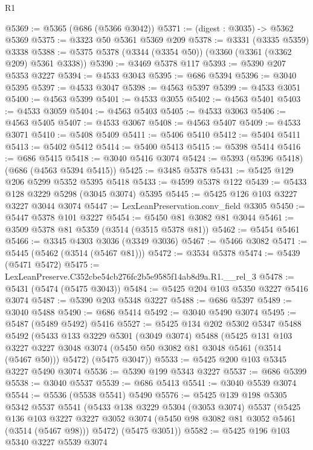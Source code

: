 \begin{lexlean}{R1}
\begin{coremodule}
@5369 := @5365 (@686 (@5366 @3042))
@5371 := (digest : @3035) -> @5362 @5369
@5375 := @3323 @50 @5361 @5369 @209
@5378 := @3331 (@3335 @5359) @3338
@5388 := @5375 @5378 (@3344 (@3354 @50)) (@3360 (@3361 (@3362 @209) @5361 @3338))
@5390 := @3469 @5378 @117
@5393 := @5390 @207 @5353 @3227
@5394 := @4533 @3043
@5395 := @686 @5394
@5396 := @3040 @5395
@5397 := @4533 @3047
@5398 := @4563 @5397
@5399 := @4533 @3051
@5400 := @4563 @5399
@5401 := @4533 @3055
@5402 := @4563 @5401
@5403 := @4533 @3059
@5404 := @4563 @5403
@5405 := @4533 @3063
@5406 := @4563 @5405
@5407 := @4533 @3067
@5408 := @4563 @5407
@5409 := @4533 @3071
@5410 := @5408 @5409
@5411 := @5406 @5410
@5412 := @5404 @5411
@5413 := @5402 @5412
@5414 := @5400 @5413
@5415 := @5398 @5414
@5416 := @686 @5415
@5418 := @3040 @5416 @3074
@5424 := @5393 (@5396 @5418) (@686 (@4563 @5394 @5415))
@5425 := @3485 @5378
@5431 := @5425 @129 @206 @5299 @5352 @5395 @5418
@5433 := @4599 @5378 @122
@5439 := @5433 @128 @3229 @5298 (@3045 @3074) @5395
@5445 := @5425 @126 @103 @3227 @3227 @3044 @3074
@5447 := LexLeanPreservation.conv_field @3305
@5450 := @5447 @5378 @101 @3227
@5454 := @5450 @81 @3082 @81 @3044
@5461 := @3509 @5378 @81 @5359 (@3514 (@3515 @5378 @81))
@5462 := @5454 @5461
@5466 := @3345 @4303 @3036 (@3349 @3036)
@5467 := @5466 @3082
@5471 := @5445 (@5462 (@3514 (@5467 @81)))
@5472 := @3534 @5378
@5474 := @5439 (@5471 @5472)
@5475 := LexLeanPreserve.C352cbe54cb276fc2b5e9585f14ab8d9a.R1.__rel_3
@5478 := @5431 (@5474 (@5475 @3043))
@5484 := @5425 @204 @103 @5350 @3227 @5416 @3074
@5487 := @5390 @203 @5348 @3227
@5488 := @686 @5397
@5489 := @3040 @5488
@5490 := @686 @5414
@5492 := @3040 @5490 @3074
@5495 := @5487 (@5489 @5492) @5416
@5527 := @5425
    @134
    @202
    @5302
    @5347
    @5488
    @5492
    (@5433
      @133
      @3229
      @5301
      (@3049 @3074)
      @5488
      (@5425
        @131
        @103
        @3227
        @3227
        @3048
        @3074
        (@5450 @50 @3082 @81 @3048 @5461 (@3514 (@5467 @50)))
        @5472)
      (@5475 @3047))
@5533 := @5425 @200 @103 @5345 @3227 @5490 @3074
@5536 := @5390 @199 @5343 @3227
@5537 := @686 @5399
@5538 := @3040 @5537
@5539 := @686 @5413
@5541 := @3040 @5539 @3074
@5544 := @5536 (@5538 @5541) @5490
@5576 := @5425
    @139
    @198
    @5305
    @5342
    @5537
    @5541
    (@5433
      @138
      @3229
      @5304
      (@3053 @3074)
      @5537
      (@5425
        @136
        @103
        @3227
        @3227
        @3052
        @3074
        (@5450 @98 @3082 @81 @3052 @5461 (@3514 (@5467 @98)))
        @5472)
      (@5475 @3051))
@5582 := @5425 @196 @103 @5340 @3227 @5539 @3074

\end{coremodule}
\end{lexlean}
